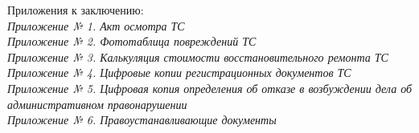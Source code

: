 Приложения к заключению:\\

\noindent \textit{\small 
	Приложение № 1. Акт осмотра ТС \\
	Приложение № 2. Фототаблица повреждений ТС \\
	Приложение № 3. Калькуляция стоимости восстановительного ремонта ТС \\
	Приложение № 4. Цифровые копии регистрационных документов ТС\\
	Приложение № 5. Цифровая копия определения об отказе в возбуждении  дела об административном правонарушении\\ %
	Приложение № 6. Правоустанавливающие документы\\}

\vspace{20mm}



%
%
%